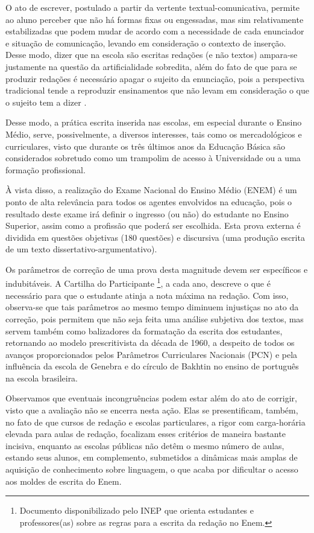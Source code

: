 \documentclass[portuguese]{textolivre}
\begin{document}
O ato de escrever, postulado a partir da vertente textual-comunicativa, permite ao aluno perceber que não há formas fixas ou engessadas, mas sim relativamente estabilizadas que podem mudar de acordo com a necessidade de cada enunciador e situação de comunicação, levando em consideração o contexto de inserção. Desse modo, dizer que na escola são escritas redações (e não textos) ampara-se justamente na questão da artificialidade sobredita, além do fato de que para se produzir redações é necessário apagar o sujeito da enunciação, pois a perspectiva tradicional tende a reproduzir ensinamentos que não levam em consideração o que o sujeito tem a dizer \cite{geraldi_concepcoes_1984}. 

Desse modo, a prática escrita inserida nas escolas, em especial durante o Ensino Médio, serve, possivelmente, a diversos interesses, tais como os mercadológicos e curriculares, visto que durante os três últimos anos da Educação Básica são considerados sobretudo como um trampolim de acesso à Universidade ou a uma formação profissional. 

À vista disso, a realização do Exame Nacional do Ensino Médio (ENEM) é um ponto de alta relevância para todos os agentes envolvidos na educação, pois o resultado deste exame irá definir o ingresso (ou não) do estudante no Ensino Superior, assim como a profissão que poderá ser escolhida. Esta prova externa é dividida em questões objetivas (180 questões) e discursiva (uma produção escrita de um texto dissertativo-argumentativo). 

Os parâmetros de correção de uma prova desta magnitude devem ser específicos e indubitáveis. A Cartilha do Participante \cite{brasil_redacao_2022}\footnote{Documento disponibilizado pelo INEP que orienta estudantes e professores(as) sobre as regras para a escrita da redação no Enem.}, a cada ano, descreve o que é necessário para que o estudante atinja a nota máxima na redação. Com isso, observa-se que tais parâmetros ao mesmo tempo diminuem injustiças no ato da correção, pois permitem que não seja feita uma análise subjetiva dos textos, mas servem também como balizadores da formatação da escrita dos estudantes, retornando ao modelo prescritivista da década de 1960, a despeito de todos os avanços proporcionados pelos Parâmetros Curriculares Nacionais (PCN) e pela influência da escola de Genebra e do círculo de Bakhtin no ensino de português na escola brasileira. 

Observamos que eventuais incongruências podem estar além do ato de corrigir, visto que a avaliação não se encerra nesta ação. Elas se presentificam, também, no fato de que cursos de redação e escolas particulares, a rigor com carga-horária elevada para aulas de redação, focalizam esses critérios de maneira bastante incisiva, enquanto as escolas públicas não detêm o mesmo número de aulas, estando seus alunos, em complemento, submetidos a dinâmicas mais amplas de aquisição de conhecimento sobre linguagem, o que acaba por dificultar o acesso aos moldes de escrita do Enem. 
\end{document}
